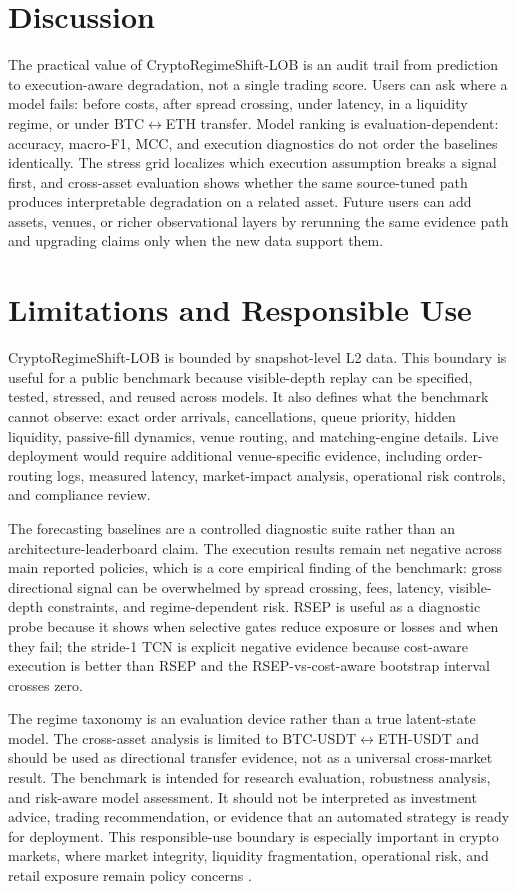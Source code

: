\documentclass[conference]{IEEEtran}
\begin{document}
\section{Discussion}
The practical value of CryptoRegimeShift-LOB is an audit trail from prediction to execution-aware degradation, not a single trading score. Users can ask where a model fails: before costs, after spread crossing, under latency, in a liquidity regime, or under BTC$\leftrightarrow$ETH transfer. Model ranking is evaluation-dependent: accuracy, macro-F1, MCC, and execution diagnostics do not order the baselines identically. The stress grid localizes which execution assumption breaks a signal first, and cross-asset evaluation shows whether the same source-tuned path produces interpretable degradation on a related asset. Future users can add assets, venues, or richer observational layers by rerunning the same evidence path and upgrading claims only when the new data support them.

\section{Limitations and Responsible Use}
CryptoRegimeShift-LOB is bounded by snapshot-level L2 data. This boundary is useful for a public benchmark because visible-depth replay can be specified, tested, stressed, and reused across models. It also defines what the benchmark cannot observe: exact order arrivals, cancellations, queue priority, hidden liquidity, passive-fill dynamics, venue routing, and matching-engine details. Live deployment would require additional venue-specific evidence, including order-routing logs, measured latency, market-impact analysis, operational risk controls, and compliance review.

The forecasting baselines are a controlled diagnostic suite rather than an architecture-leaderboard claim. The execution results remain net negative across main reported policies, which is a core empirical finding of the benchmark: gross directional signal can be overwhelmed by spread crossing, fees, latency, visible-depth constraints, and regime-dependent risk. RSEP is useful as a diagnostic probe because it shows when selective gates reduce exposure or losses and when they fail; the stride-1 TCN is explicit negative evidence because cost-aware execution is better than RSEP and the RSEP-vs-cost-aware bootstrap interval crosses zero.

The regime taxonomy is an evaluation device rather than a true latent-state model. The cross-asset analysis is limited to BTC-USDT$\leftrightarrow$ETH-USDT and should be used as directional transfer evidence, not as a universal cross-market result. The benchmark is intended for research evaluation, robustness analysis, and risk-aware model assessment. It should not be interpreted as investment advice, trading recommendation, or evidence that an automated strategy is ready for deployment. This responsible-use boundary is especially important in crypto markets, where market integrity, liquidity fragmentation, operational risk, and retail exposure remain policy concerns \cite{iosco_crypto2023,fsb2023crypto}.
\end{document}
